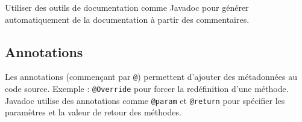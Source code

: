 \documentclass{article}
\begin{document}

Utiliser des outils de documentation comme Javadoc pour générer automatiquement de la documentation à partir des commentaires.

\subsection{Annotations}

Les annotations (commençant par \texttt{@}) permettent d'ajouter des métadonnées au code source.  Exemple : \texttt{@Override} pour forcer la redéfinition d'une méthode. Javadoc utilise des annotations comme \texttt{@param} et \texttt{@return} pour spécifier les paramètres et la valeur de retour des méthodes.
\end{document}
